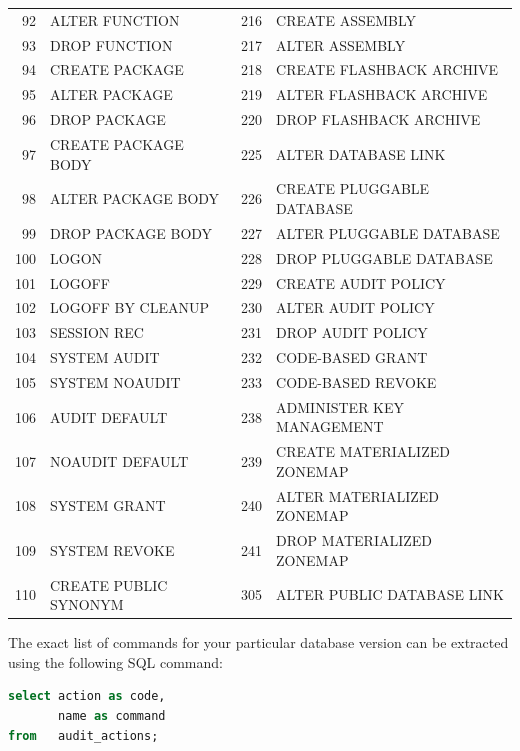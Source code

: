 \begin{appendix}
\begin{longtable}[]{@{}rl|rl@{}}
92   & ALTER FUNCTION               & 216 & CREATE ASSEMBLY              \\
93   & DROP FUNCTION                & 217 & ALTER ASSEMBLY               \\
94   & CREATE PACKAGE               & 218 & CREATE FLASHBACK ARCHIVE     \\
95   & ALTER PACKAGE                & 219 & ALTER FLASHBACK ARCHIVE      \\
96   & DROP PACKAGE                 & 220 & DROP FLASHBACK ARCHIVE       \\
97   & CREATE PACKAGE BODY          & 225 & ALTER DATABASE LINK          \\
98   & ALTER PACKAGE BODY           & 226 & CREATE PLUGGABLE DATABASE    \\
99   & DROP PACKAGE BODY            & 227 & ALTER PLUGGABLE DATABASE     \\
100  & LOGON                        & 228 & DROP PLUGGABLE DATABASE      \\
101  & LOGOFF                       & 229 & CREATE AUDIT POLICY          \\
102  & LOGOFF BY CLEANUP            & 230 & ALTER AUDIT POLICY           \\
103  & SESSION REC                  & 231 & DROP AUDIT POLICY            \\
104  & SYSTEM AUDIT                 & 232 & CODE-BASED GRANT             \\
105  & SYSTEM NOAUDIT               & 233 & CODE-BASED REVOKE            \\
106  & AUDIT DEFAULT                & 238 & ADMINISTER KEY MANAGEMENT    \\
107  & NOAUDIT DEFAULT              & 239 & CREATE MATERIALIZED ZONEMAP  \\
108  & SYSTEM GRANT                 & 240 & ALTER MATERIALIZED ZONEMAP   \\
109  & SYSTEM REVOKE                & 241 & DROP MATERIALIZED ZONEMAP    \\
110  & CREATE PUBLIC SYNONYM        & 305 & ALTER PUBLIC DATABASE LINK   \\

\bottomrule
\end{longtable}

The exact list of commands for your particular database version can be
extracted using the following SQL command:

\begin{lstlisting}[language=SQL,caption={SQL Query to List Oracle Command Codes}]
select action as code,
       name as command
from   audit_actions;
\end{lstlisting}


\end{appendix}
